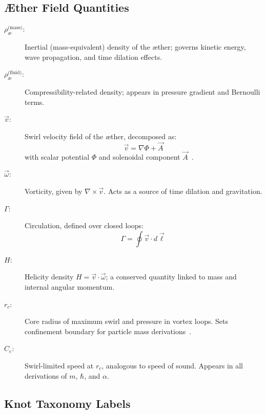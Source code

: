 \documentclass[preprint]{revtex4-2}
\begin{document}
            \subsection*{Æther Field Quantities}
            \begin{description}
                \item[$\rho_{\text{\ae}}^{\text{(mass)}}$:] Inertial (mass-equivalent) density of the æther; governs kinetic energy, wave propagation, and time dilation effects.
                \item[$\rho_{\text{\ae}}^{\text{(fluid)}}$:] Compressibility-related density; appears in pressure gradient and Bernoulli terms.
                \item[$\vec{v}$:] Swirl velocity field of the æther, decomposed as:
                \[
                \vec{v} = \nabla \Phi + \vec{A}
                \]
                with scalar potential $\Phi$ and solenoidal component $\vec{A}$~\cite{kleckner2013knots}.
                \item[$\vec{\omega}$:] Vorticity, given by $\nabla \times \vec{v}$. Acts as a source of time dilation and gravitation.
                \item[$\Gamma$:] Circulation, defined over closed loops:
                \[
                \Gamma = \oint \vec{v} \cdot d\vec{\ell}
                \]
                \item[$H$:] Helicity density $H = \vec{v} \cdot \vec{\omega}$; a conserved quantity linked to mass and internal angular momentum.
                \item[$r_c$:] Core radius of maximum swirl and pressure in vortex loops. Sets confinement boundary for particle mass derivations~\cite{verlinde2011origin}.
                \item[$C_e$:] Swirl-limited speed at $r_c$, analogous to speed of sound. Appears in all derivations of $m$, $\hbar$, and $\alpha$.
            \end{description}
        
            \subsection*{Knot Taxonomy Labels}
        
\end{document}
